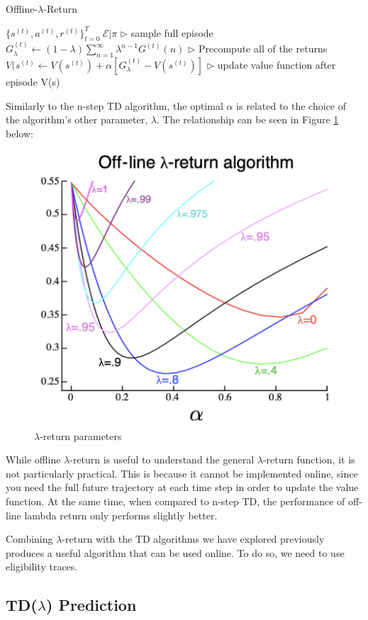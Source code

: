 \documentclass[11pt]{article}
\begin{document}
\begin{algorithm}[H]
\caption{Offline-$\lambda$-Return}
\label{algo:OLR}
\begin{algorithmic}[1]
\STATE $\{s^{(t)}, a^{(t)}, r^{(t)}\}_{t=0}^T ~ \mathcal{E}|\pi$ \hfill $\triangleright$ sample full episode
\STATE $G_{\lambda}^{(t)} \xleftarrow{} (1 - \lambda) \sum_{n=1}^{\infty} \lambda^{n-1} G^{(t)}(n)$ \hfill $\triangleright$ Precompute all of the returns
\ENDFOR
{} 
\STATE $V(s^{(t)} \xleftarrow{} V(s^{(t)}) + \alpha [G_{\lambda}^{(t)} - V(s^{(t)})]$ \hfill $\triangleright$ update value function after episode
\ENDFOR
\ENDFOR
\RETURN V(s)
\end{algorithmic}
\end{algorithm}

Similarly to the n-step TD algorithm, the optimal $\alpha$ is related to the choice of the algorithm's other parameter, $\lambda$. The relationship can be seen in Figure \ref{fig:lambda-return_params} below:

\begin{figure}[H]
    \centering
    \includegraphics[width=0.35\linewidth]{images/lambda-return_params.png}
    \caption{$\lambda$-return parameters}
    \label{fig:lambda-return_params}
\end{figure}

While offline $\lambda$-return is useful to understand the general $\lambda$-return function, it is not particularly practical. This is because it cannot be implemented online, since you need the full future trajectory at each time step in order to update the value function. At the same time, when compared to n-step TD, the performance of off-line lambda return only performs slightly better. 

Combining $\lambda$-return with the TD algorithms we have explored previously produces a useful algorithm that can be used online. To do so, we need to use eligibility traces. 

\subsection{TD($\lambda$) Prediction}
\end{document}
